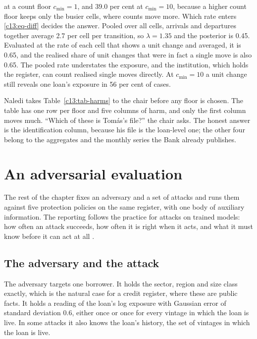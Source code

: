 at a count floor $c_{\min}=1$, and 39.0 per cent at $c_{\min}=10$, because a higher
count floor keeps only the busier cells, where counts move more.
Which rate enters \eqref{c13:eq-diff} decides the answer. Pooled over all cells,
arrivals and departures together average 2.7 per cell per transition, so
$\lambda = 1.35$ and the posterior is 0.45. Evaluated at the rate of each cell that
shows a unit change and averaged, it is 0.65, and the realised share of unit changes
that were in fact a single move is also 0.65.
The pooled rate understates the exposure, and the institution, which holds the
register, can count realised single moves directly. At $c_{\min}=10$ a unit change
still reveals one loan's exposure in 56 per cent of cases.

Naledi takes Table~\ref{c13:tab-harms} to the chair before any floor is chosen. The
table has one row per floor and five columns of harm, and only the first column
moves much. ``Which of these is Tomás's file?'' the chair asks. The honest answer is
the identification column, because his file is the loan-level one; the other four
belong to the aggregates and the monthly series the Bank already publishes.

\section{An adversarial evaluation}\label{c13:sec-eval}

The rest of the chapter fixes an adversary and a set of attacks and runs them
against five protection policies on the same register, with one body of auxiliary
information. The reporting follows the practice for attacks on trained models: how
often an attack succeeds, how often it is right when it acts, and what it must know
before it can act at all \citep{shokri2017,carlini2022}.

\subsection{The adversary and the attack}

The adversary targets one borrower. It holds the sector, region and size class
exactly, which is the natural case for a credit register, where these are
public facts. It holds a reading of the loan's log exposure with Gaussian error of
standard deviation 0.6, either once or once for every vintage in which the loan is
live. In some attacks it also knows the loan's history, the set of vintages in which
the loan is live.

